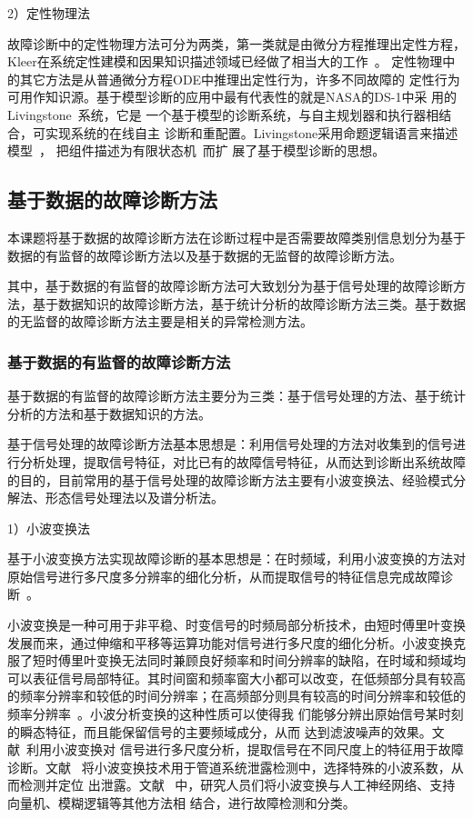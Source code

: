 2）定性物理法

故障诊断中的定性物理方法可分为两类，第一类就是由微分方程推理出定性方程，
Kleer在系统定性建模和因果知识描述领域已经做了相当大的工作~\cite{de1992characterizing, de1987diagnosing, de1984qualitative}。
定性物理中的其它方法是从普通微分方程ODE中推理出定性行为，许多不同故障的
定性行为可用作知识源。基于模型诊断的应用中最有代表性的就是NASA的DS-1中采
用的Livingstone~\cite{schwabacher2002nasa, bernard1998design}系统，它是
一个基于模型的诊断系统，与自主规划器和执行器相结合，可实现系统的在线自主
诊断和重配置。Livingstone采用命题逻辑语言来描述模型~\cite{muscettola1998remote, williams1996model}，
把组件描述为有限状态机~\cite{williams1996autonomous, genc2007distributed}而扩
展了基于模型诊断的思想。

\subsection{基于数据的故障诊断方法}

本课题将基于数据的故障诊断方法在诊断过程中是否需要故障类别信息划分为基于
数据的有监督的故障诊断方法以及基于数据的无监督的故障诊断方法。

其中，基于数据的有监督的故障诊断方法可大致划分为基于信号处理的故障诊断方
法，基于数据知识的故障诊断方法，基于统计分析的故障诊断方法三类。基于数据
的无监督的故障诊断方法主要是相关的异常检测方法。

\subsubsection{基于数据的有监督的故障诊断方法}

基于数据的有监督的故障诊断方法主要分为三类：基于信号处理的方法、基于统计
分析的方法和基于数据知识的方法。

基于信号处理的故障诊断方法基本思想是：利用信号处理的方法对收集到的信号进
行分析处理，提取信号特征，对比已有的故障信号特征，从而达到诊断出系统故障
的目的，目前常用的基于信号处理的故障诊断方法主要有小波变换法、经验模式分
解法、形态信号处理法以及谱分析法。

1）小波变换法

基于小波变换方法实现故障诊断的基本思想是：在时频域，利用小波变换的方法对
原始信号进行多尺度多分辨率的细化分析，从而提取信号的特征信息完成故障诊断~\cite{naderi2008modeling, carneiro2008incipient}。

小波变换是一种可用于非平稳、时变信号的时频局部分析技术，由短时傅里叶变换
发展而来，通过伸缩和平移等运算功能对信号进行多尺度的细化分析。小波变换克
服了短时傅里叶变换无法同时兼顾良好频率和时间分辨率的缺陷，在时域和频域均
可以表征信号局部特征。其时间窗和频率窗大小都可以改变，在低频部分具有较高
的频率分辨率和较低的时间分辨率；在高频部分则具有较高的时间分辨率和较低的
频率分辨率~\cite{zhoudonghua2009fault}。小波分析变换的这种性质可以使得我
们能够分辨出原始信号某时刻的瞬态特征，而且能保留信号的主要频域成分，从而
达到滤波噪声的效果。文献~利用小波变换对
信号进行多尺度分析，提取信号在不同尺度上的特征用于故障诊断。文献~
将小波变换技术用于管道系统泄露检测中，选择特殊的小波系数，从而检测并定位
出泄露。文献~
中，研究人员们将小波变换与人工神经网络、支持向量机、模糊逻辑等其他方法相
结合，进行故障检测和分类。

